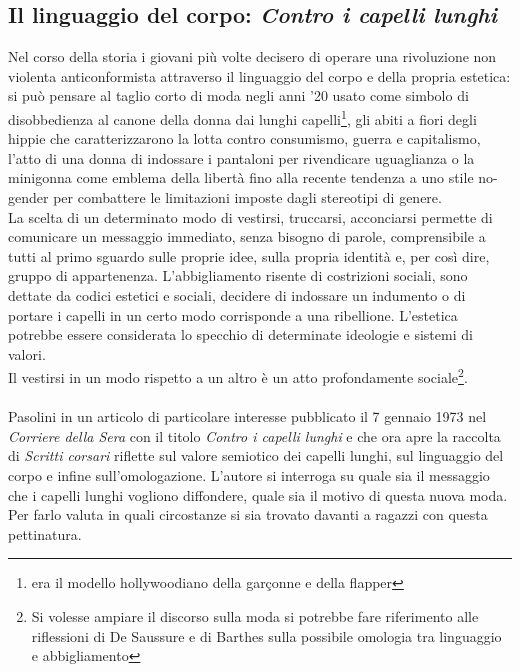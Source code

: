 \subsection{Il linguaggio del corpo: \textbf{\textit{Contro i capelli lunghi}}}
Nel corso della storia i giovani più volte decisero di operare una rivoluzione non violenta anticonformista attraverso il linguaggio del corpo e della propria estetica: si può pensare al taglio corto di moda negli anni '20 usato come simbolo di disobbedienza al canone della donna dai lunghi capelli\footnote{era il modello hollywoodiano della garçonne e della flapper},  gli abiti a fiori degli hippie che caratterizzarono la lotta contro consumismo, guerra e capitalismo, l'atto di una donna di indossare i pantaloni per rivendicare uguaglianza o la minigonna come emblema della libertà fino alla recente tendenza a uno stile no-gender per combattere le limitazioni imposte dagli stereotipi di genere.
\\La scelta di un determinato modo di vestirsi, truccarsi, acconciarsi permette di comunicare un messaggio immediato, senza bisogno di parole, comprensibile a tutti al primo sguardo sulle proprie idee, sulla propria identità e, per così dire, gruppo di appartenenza.
L'abbigliamento risente di costrizioni sociali, sono dettate da codici estetici e sociali, decidere di indossare un indumento o di portare i capelli in un certo modo corrisponde a una ribellione.
L'estetica potrebbe essere considerata lo specchio di determinate ideologie e sistemi di valori. 
\\Il vestirsi in un modo rispetto a un altro è un atto profondamente sociale\footnote{Si volesse ampiare il discorso sulla moda si potrebbe fare riferimento alle riflessioni di De Saussure e di Barthes sulla possibile omologia tra linguaggio e abbigliamento}.

\paragraph{}Pasolini in un articolo di particolare interesse pubblicato il 7 gennaio 1973 nel \textit{Corriere della Sera} con il titolo \textit{Contro i capelli lunghi} e che ora apre la raccolta di \textit{Scritti corsari} riflette sul valore semiotico dei capelli lunghi, sul linguaggio del corpo e infine sull'omologazione.
L'autore si interroga su quale sia il messaggio che i capelli lunghi vogliono diffondere, quale sia il motivo di questa nuova moda.
Per farlo valuta in quali circostanze si sia trovato davanti a ragazzi con questa pettinatura.

